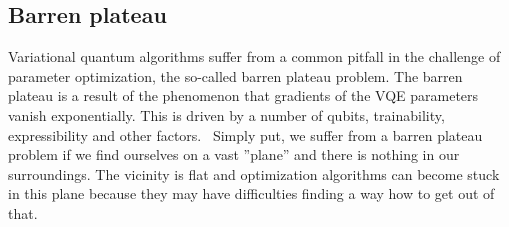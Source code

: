 \subsection{Barren plateau}
Variational quantum algorithms suffer from a common pitfall in the challenge of parameter optimization, the so-called barren plateau problem. The barren plateau is a result of the phenomenon that gradients of the VQE parameters vanish exponentially. This is driven by a number of qubits, trainability, expressibility and other factors.~\cite{fedorov2021vqe} Simply put, we suffer from a barren plateau problem if we find ourselves on a vast ''plane'' and there is nothing in our surroundings. The vicinity is flat and optimization algorithms can become stuck in this plane because they may have difficulties finding a way how to get out of that. 
